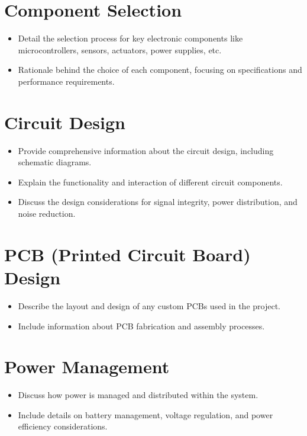 \section{Component Selection}
\begin{itemize}
	\item Detail the selection process for key electronic components like microcontrollers, sensors, actuators, power supplies, etc.
	\item Rationale behind the choice of each component, focusing on specifications and performance requirements.
\end{itemize}
\section{Circuit Design}
\begin{itemize}
	\item Provide comprehensive information about the circuit design, including schematic diagrams.
	\item Explain the functionality and interaction of different circuit components.
	\item Discuss the design considerations for signal integrity, power distribution, and noise reduction.
\end{itemize}
\section{PCB (Printed Circuit Board) Design}
\begin{itemize}
	\item Describe the layout and design of any custom PCBs used in the project.
	\item Include information about PCB fabrication and assembly processes.
\end{itemize}
\section{Power Management}
\begin{itemize}
	\item Discuss how power is managed and distributed within the system.
	\item Include details on battery management, voltage regulation, and power efficiency considerations.
\end{itemize}